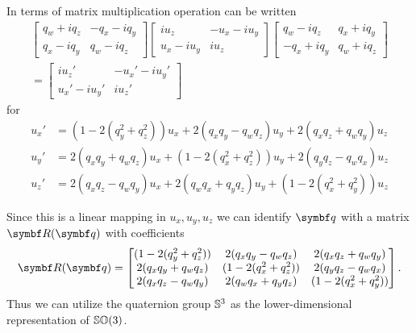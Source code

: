 In terms of matrix multiplication operation can be written
\begin{equation}
  \begin{aligned}
    \begin{bmatrix}
      q_w + i q_z & -q_x - i q_y \\
      q_x - i q_y & q_w - i q_z
    \end{bmatrix} \begin{bmatrix}
      i u_z       & -u_x - i u_y \\
      u_x - i u_y & i u_z
    \end{bmatrix} \begin{bmatrix}
      q_w - i q_z   & q_x + i q_y \\
      - q_x + i q_y & q_w + i q_z
    \end{bmatrix} \\
    = \begin{bmatrix}
      i u_z'        & -u_x' - i u_y' \\
      u_x' - i u_y' & i u_z'
    \end{bmatrix}
  \end{aligned}
\end{equation}
for
\begin{equation}
  \begin{aligned}
    u_x' & = (1 - 2(q_y^2 + q_z^2)) u_x + 2(q_x q_y - q_w q_z) u_y + 2( q_x q_z + q_w q_y ) u_z   \\
    u_y' & = 2(q_x q_y + q_w q_z) u_x + (1 - 2 (q_x^2 + q_z^2)) u_y + 2( q_y q_z-q_w q_x) u_z     \\
    u_z' & = 2 (q_x q_z  - q_w q_y) u_x  + 2 (q_w q_x + q_y q_z) u_y + (1 - 2(q_x^2 + q_y^2)) u_z
  \end{aligned}
\end{equation}

Since this is a linear mapping in $u_x, u_y, u_z$ we can identify $\bq$ with a matrix $\bR(\bq)$ with coefficients
\begin{equation}
  \label{eq:quat_to_so3}
  \bR(\bq) = \begin{bmatrix}
    (1 - 2(q_y^2 + q_z^2)) & 2(q_x q_y - q_w q_z)    & 2( q_x q_z + q_w q_y ) \\
    2(q_x q_y + q_w q_z)   & (1 - 2 (q_x^2 + q_z^2)) & 2( q_y q_z-q_w q_x)    \\
    2 (q_x q_z  - q_w q_y) & 2 (q_w q_x + q_y q_z)   & (1 - 2(q_x^2 + q_y^2))
  \end{bmatrix}.
\end{equation}
Thus we can utilize the quaternion group ${\mathbb{S}^3}$ as the lower-dimensional representation of ${\mathbb{SO}(3)}$.

